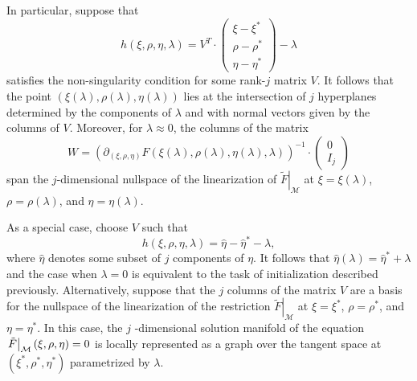 \documentclass{article}
\begin{document}
In particular, suppose that%
\begin{equation}
h\left( \xi ,\rho ,\eta ,\lambda \right) =V^{T}\cdot \left( 
\begin{array}{c}
\xi -\xi ^{\ast } \\ 
\rho -\rho ^{\ast } \\ 
\eta -\eta ^{\ast }%
\end{array}%
\right) -\lambda   \label{eq: hlinear}
\end{equation}%
satisfies the non-singularity condition for some rank-$j$ matrix $V$. It
follows that the point $\left( \xi \left( \lambda \right) ,\rho \left(
\lambda \right) ,\eta \left( \lambda \right) \right) $ lies at the
intersection of $j$ hyperplanes determined by the components of $\lambda $
and with normal vectors given by the columns of $V$. Moreover, for $\lambda
\approx 0$, the columns of the matrix%
\[
W=\left( \partial _{\left( \xi ,\rho ,\eta \right) }F\left( \xi \left(
\lambda \right) ,\rho \left( \lambda \right) ,\eta \left( \lambda \right)
,\lambda \right) \right) ^{-1}\cdot \left( 
\begin{array}{c}
0 \\ 
I_{j}%
\end{array}%
\right) 
\]%
span the $j$-dimensional nullspace of the linearization of $\left. \tilde{F}%
\right| _{\mathcal{M}}$ at $\xi =\xi \left( \lambda \right) $, $\rho =\rho
\left( \lambda \right) $, and $\eta =\eta \left( \lambda \right) $.

As a special case, choose $V$ such that%
\[
h\left( \xi ,\rho ,\eta ,\lambda \right) =\hat{\eta}-\hat{\eta}^{\ast
}-\lambda ,
\]%
where $\hat{\eta}$ denotes some subset of $j$ components of $\eta $. It
follows that $\hat{\eta}\left( \lambda \right) =\hat{\eta}^{\ast }+\lambda $
and the case when $\lambda =0$ is equivalent to the task of initialization
described previously. Alternatively, suppose that the $j$ columns of the
matrix $V$ are a basis for the nullspace of the linearization of the
restriction $\left. \tilde{F}\right| _{\mathcal{M}}$ at $\xi =\xi ^{\ast }$, 
$\rho =\rho ^{\ast }$, and $\eta =\eta ^{\ast }$. In this case, the $j$%
-dimensional solution manifold of the equation $\left. \tilde{F}\right| _{%
\mathcal{M}}\left( \xi ,\rho ,\eta \right) =0$ is locally represented as a
graph over the tangent space at $\left( \xi ^{\ast },\rho ^{\ast },\eta
^{\ast }\right) $ parametrized by $\lambda $.
\end{document}
